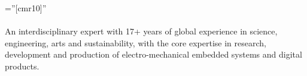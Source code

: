 \font\fb=''[cmr10]''

\par{
\paragraph{}
An interdisciplinary expert with 17+ years of global experience in science, engineering, arts and sustainability, with the core expertise in research, development and production of electro-mechanical embedded systems and digital products.
\bigskip\par}

